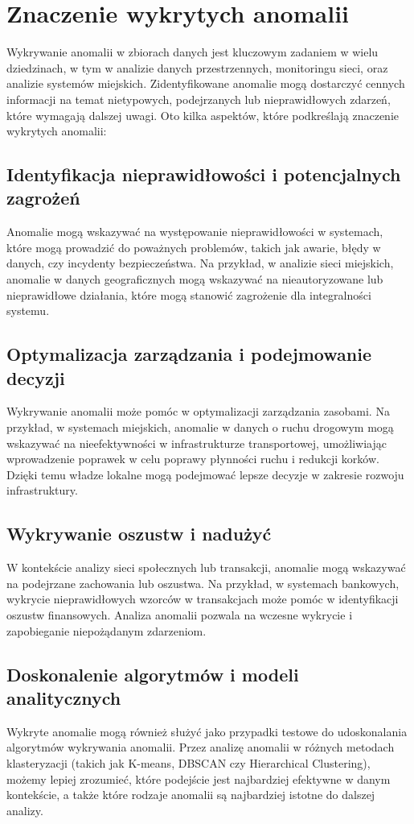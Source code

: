 \documentclass[a4paper,fleqn]{cas-dc}
\begin{document}
\section{Znaczenie wykrytych anomalii}
Wykrywanie anomalii w zbiorach danych jest kluczowym zadaniem w wielu dziedzinach, w tym w analizie danych przestrzennych, monitoringu sieci, oraz analizie systemów miejskich. Zidentyfikowane anomalie mogą dostarczyć cennych informacji na temat nietypowych, podejrzanych lub nieprawidłowych zdarzeń, które wymagają dalszej uwagi. Oto kilka aspektów, które podkreślają znaczenie wykrytych anomalii:
\subsection{Identyfikacja nieprawidłowości i potencjalnych zagrożeń}
Anomalie mogą wskazywać na występowanie nieprawidłowości w systemach, które mogą prowadzić do poważnych problemów, takich jak awarie, błędy w danych, czy incydenty bezpieczeństwa. Na przykład, w analizie sieci miejskich, anomalie w danych geograficznych mogą wskazywać na nieautoryzowane lub nieprawidłowe działania, które mogą stanowić zagrożenie dla integralności systemu.
\subsection{Optymalizacja zarządzania i podejmowanie decyzji}
Wykrywanie anomalii może pomóc w optymalizacji zarządzania zasobami. Na przykład, w systemach miejskich, anomalie w danych o ruchu drogowym mogą wskazywać na nieefektywności w infrastrukturze transportowej, umożliwiając wprowadzenie poprawek w celu poprawy płynności ruchu i redukcji korków. Dzięki temu władze lokalne mogą podejmować lepsze decyzje w zakresie rozwoju infrastruktury.
\subsection{Wykrywanie oszustw i nadużyć}
W kontekście analizy sieci społecznych lub transakcji, anomalie mogą wskazywać na podejrzane zachowania lub oszustwa. Na przykład, w systemach bankowych, wykrycie nieprawidłowych wzorców w transakcjach może pomóc w identyfikacji oszustw finansowych. Analiza anomalii pozwala na wczesne wykrycie i zapobieganie niepożądanym zdarzeniom.
\subsection{Doskonalenie algorytmów i modeli analitycznych}
Wykryte anomalie mogą również służyć jako przypadki testowe do udoskonalania algorytmów wykrywania anomalii. Przez analizę anomalii w różnych metodach klasteryzacji (takich jak K-means, DBSCAN czy Hierarchical Clustering), możemy lepiej zrozumieć, które podejście jest najbardziej efektywne w danym kontekście, a także które rodzaje anomalii są najbardziej istotne do dalszej analizy.
\end{document}
